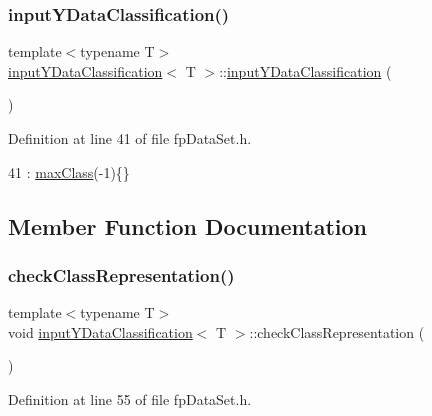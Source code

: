 \subsubsection{\texorpdfstring{input\+Y\+Data\+Classification()}{inputYDataClassification()}}
{\footnotesize\ttfamily template$<$typename T$>$ \\
\hyperlink{classinputYDataClassification}{input\+Y\+Data\+Classification}$<$ T $>$\+::\hyperlink{classinputYDataClassification}{input\+Y\+Data\+Classification} (\begin{DoxyParamCaption}{ }\end{DoxyParamCaption})\hspace{0.3cm}{\ttfamily [inline]}}



Definition at line 41 of file fp\+Data\+Set.\+h.


\begin{DoxyCode}
41 : \hyperlink{classinputYDataClassification_a869375cfd78524833cd69aca9daf8aec}{maxClass}(-1)\{\}
\end{DoxyCode}


\subsection{Member Function Documentation}
\mbox{\label{classinputYDataClassification_a738130d6cf0ed15aff355d612aae67ca}} 
\subsubsection{\texorpdfstring{check\+Class\+Representation()}{checkClassRepresentation()}}
{\footnotesize\ttfamily template$<$typename T$>$ \\
void \hyperlink{classinputYDataClassification}{input\+Y\+Data\+Classification}$<$ T $>$\+::check\+Class\+Representation (\begin{DoxyParamCaption}{ }\end{DoxyParamCaption})\hspace{0.3cm}{\ttfamily [inline]}}



Definition at line 55 of file fp\+Data\+Set.\+h.


